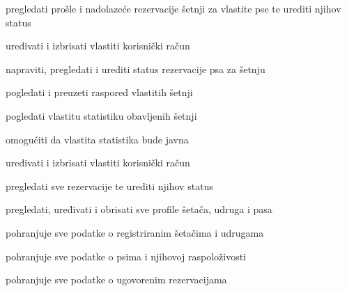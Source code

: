 \begin{packed_enum}
\begin{packed_enum}
					\item pregledati prošle i nadolazeće rezervacije šetnji za vlastite pse te urediti njihov status  
					
					\item uređivati i izbrisati vlastiti korisnički račun
					
				\end{packed_enum}
				
				\item  {}
				
				\begin{packed_enum}
				    \item napraviti, pregledati i urediti status rezervacije psa za šetnju
				    
				    \item pogledati i preuzeti raspored vlastitih šetnji
				    
				    \item pogledati vlastitu statistiku obavljenih šetnji
				    
				    \item omogućiti da vlastita statistika bude javna
				    
				    \item uređivati i izbrisati vlastiti korisnički račun
				    
				\end{packed_enum}
				
				\item  {}
				\begin{packed_enum}
				    \item pregledati sve rezervacije te urediti njihov status
				    
				    \item pregledati, uređivati i obrisati sve profile šetača, udruga i pasa
				\end{packed_enum}
				
				\item  {}
				\begin{packed_enum}
				    \item pohranjuje sve podatke o registriranim šetačima i udrugama
				    
				    \item pohranjuje sve podatke o psima i njihovoj raspoloživosti
				    
				    \item pohranjuje sve podatke o ugovorenim rezervacijama
				\end{packed_enum}
				
			\end{packed_enum}
			
